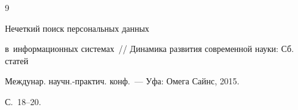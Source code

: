 \vspace*{-2pt}


  


{\small\frenchspacing


{%




\begin{thebibliography}{9}




   Нечеткий поиск персональных данных 


в~информационных системах~/\!\!/ Динамика развития современной науки: Сб. статей 


Междунар. научн.-практич. конф.~--- Уфа: Омега Сайнс, 2015. 


 С.~18--20.






























\end{thebibliography}


} }








